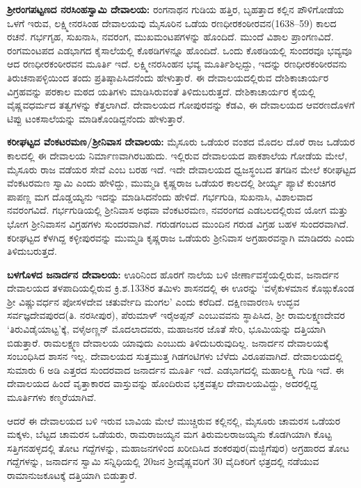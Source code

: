 \textbf{ ಶ‍್ರೀರಂಗಪಟ್ಟಣದ ನರಸಿಂಹಸ್ವಾಮಿ ದೇವಾಲಯ: } ರಂಗನಾಥನ ಗುಡಿಯ ಹತ್ತಿರ, ಬೃಹತ್ತಾದ ಕಲ್ಲಿನ ಪೌಳಿಗೋಡೆಯ ಒಳಗೆ ಇರುವ, ಲಕ್ಷ್ಮೀನರಸಿಂಹ ದೇವಾಲಯವು ಮೈಸೂರಿನ ಒಡೆಯ ರಣಧೀರಕಂಠೀರವನ(1638–59) ಕಾಲದ ರಚನೆ. ಗರ್ಭಗೃಹ, ಸುಖನಾಸಿ, ನವರಂಗ, ಮುಖಮಂಟಪಗಳನ್ನು ಹೊಂದಿದೆ. ಮುಂದೆ ವಿಶಾಲ ಪ್ರಾಂಗಣವಿದೆ. ರಂಗಮಂಟಪದ ಎಡಭಾಗದ ಕೈಸಾಲೆಯಲ್ಲಿ ಕೊಠಡಿಗಳನ್ನೂ ಹೊಂದಿದೆ. ಒಂದು ಕೊಠಡಿಯಲ್ಲಿ ಸುಂದರವೂ ಭವ್ಯವೂ ಆದ ರಣಧೀರಕಂಠೀರವನ ಮೂರ್ತಿ ಇದೆ. ಲಕ್ಷ್ಮೀನರಸಿಂಹನ ಭವ್ಯ ಮೂರ್ತಿಶಿಲ್ಪದ್ದು, ಇದನ್ನು ರಣಧೀರಕಂಠೀರವನು ತಿರುಚನಾಪಳ್ಳಿಯಿಂದ ತಂದು ಪ್ರತಿಷ್ಠಾಪಿಸಿದನೆಂದು ಹೇಳುತ್ತಾರೆ. ಈ ದೇವಾಲಯದಲ್ಲಿರುವ ದೇಶಿಕಾಚಾರ್ಯರ ವಿಗ್ರಹವನ್ನು ಪರಕಾಲ ಮಠದ ಯತಿಗಳು ಮಾಡಿಸಿರುವಂತೆ ತಿಳಿದುಬರುತ್ತದೆ. ದೇಶಿಕಾಚಾರ್ಯರ ಕೈಯಲ್ಲಿ ವೈಷ್ಣವಧರ್ಮದ ತತ್ವಗಳನ್ನು ಕೆತ್ತಲಾಗಿದೆ. ದೇವಾಲಯದ ಗೋಪುರವನ್ನು ಕೆಡವಿ, ಈ ದೇವಾಲಯದ ಆವರಣದೊಳಗೆ ಟಿಪ್ಪು ಟಂಕಸಾಲೆಯನ್ನು ಮಾಡಿಕೊಂಡಿದ್ದನೆಂದು ಹೇಳುತ್ತಾರೆ.

\textbf{ಕರೀಘಟ್ಟದ ವೆಂಕಟರಮಣ/ಶ‍್ರೀನಿವಾಸ ದೇವಾಲಯ:} ಮೈಸೂರು ಒಡೆಯರ ವಂಶದ ಮೊದಲ ದೊರೆ ರಾಜ ಒಡೆಯರ ಕಾಲದಲ್ಲಿ ಈ ದೇವಾಲಯ ನಿರ್ಮಾಣವಾಗಿರಬಹುದು. ಇಲ್ಲಿರುವ ದೇವಾಲಯದ ಪಾಕಶಾಲೆಯ ಗೋಡೆಯ ಮೇಲೆ, ಮೈಸೂರು ರಾಜ ವಡೆಯರ ಸೇವೆ ಎಂಬ ಬರಹ ಇದೆ. ಇದೇ ದೇವಾಲಯದ ಧ್ವಜಸ್ಥಂಬದ ತಗಡಿನ ಮೇಲೆ ಕರೀಘಟ್ಟದ ವೆಂಕಟರಮಣ ಸ್ವಾಮಿ ಎಂದು ಹೇಳಿದ್ದು, ಮುಮ್ಮಡಿ ಕೃಷ್ಣರಾಜ ಒಡೆಯರ ಕಾಲದಲ್ಲಿ ಶೀರ್ಯ್ಯ ಪ್ಯಾಟೆ ಕುಂಚಿಗರ ಪಾಪಣ್ಣ ಮಗ ದೊಡ್ಡಯ್ಯನು ಇದನ್ನು ಮಾಡಿಸಿದನೆಂದು ಹೇಳಿದೆ. ಗರ್ಭಗುಡಿ, ಸುಖನಾಸಿ, ವಿಶಾಲವಾದ ನವರಂಗವಿದೆ. ಗರ್ಭಗುಡಿಯಲ್ಲಿ ಶ‍್ರೀನಿವಾಸ ಅಥವಾ ವೆಂಕಟರಮಣ, ನವರಂಗದ ಎಡಬಲದಲ್ಲಿರುವ ಯೋಗ ಮತ್ತು ಭೋಗ ಶ‍್ರೀನಿವಾಸನ ವಿಗ್ರಹಗಳು ಸುಂದರವಾಗಿವೆ. ಗರುಡಗಂಬದ ಮುಂದಿನ ಗರುಡ ವಿಗ್ರಹ ಬಹಳ ಸುಂದರವಾಗಿದೆ. ಕರೀಘಟ್ಟದ ಕೆಳಗಿದ್ದ ಕಳ್ಳೀಪುರವನ್ನು ಮುಮ್ಮಡಿ ಕೃಷ್ಣರಾಜ ಒಡೆಯರು ಶ‍್ರೀನಿವಾಸ ಅಗ್ರಹಾರವನ್ನಾಗಿ ಮಾಡಿದರು ಎಂದು ತಿಳಿದುಬರುತ್ತದೆ. 

\textbf{ಬಳಗೊಳದ ಜನಾರ್ದನ ದೇವಾಲಯ:} ಊರಿನಿಂದ ಹೊರಗೆ ನಾಲೆಯ ಬಳಿ ಜೀರ್ಣಾವಸ್ಥೆಯಲ್ಲಿರುವ, ಜನಾರ್ದನ ದೇವಾಲಯದ ತಳಪಾದಿಯಲ್ಲಿರುವ ಕ್ರಿ.ಶ.1338ರ ತಮಿಳು ಶಾಸನದಲ್ಲಿ ಈ ಊರನ್ನು ‘ವಳೈಕುಳಮಾನ ಕೊಙ್ಗುಕೊಂಡ ಶ‍್ರೀ ವಿಷ್ಣುವರ್ಧನ ಪೋಸಳದೇವ ಚತುರ್ವೇದಿ ಮಂಗಲ’ ಎಂದು ಕರೆದಿದೆ. ದಕ್ಷಿಣವಾರಣಸಿ ಉದ್ಭವ ಸರ್ವಜ್ಞದೇವಪುರದ(ತಿ. ನರಸೀಪುರ), ಪೆರುಮಾಳ್​ ಇರೈಅಪ್ಪನ್​ ಎಂಬುವವನು ಸ್ಥಾಪಿಸಿದ, ಶ‍್ರೀ ರಾಮಲಕ್ಷ್ಮಣದೇವರ ‘ತಿರುವಿಡೈಯಾಟ್ಟ’ಕ್ಕೆ, ವಳೈಅಣ್ಣನ್​ ಮೊದಲಾದವರು, ಮಹಾಜನರ ಜೊತೆ ಸೇರಿ, ಭೂಮಿಯನ್ನು ದತ್ತಿಯಾಗಿ ಬಿಡುತ್ತಾರೆ. ರಾಮಲಕ್ಷ್ಮಣ ದೇವಾಲಯ ಯಾವುದು ಎಂಬುದು ತಿಳಿದುಬರುವುದಿಲ್ಲ. ಜನಾರ್ದನ ದೇವಾಲಯಕ್ಕೆ ಸಂಬಂಧಿಸಿದ ಶಾಸನ ಇಲ್ಲ. ದೇವಾಲಯದ ಸುತ್ತಮುತ್ತ ಗಿಡಗಂಟಿಗಳು ಬೆಳೆದು ವಿರೂಪವಾಗಿದೆ. ದೇವಾಲಯದಲ್ಲಿ ಸುಮಾರು 6 ಅಡಿ ಎತ್ತರದ ಸುಂದರವಾದ ಜನಾರ್ದನ ಮೂರ್ತಿ ಇದೆ. ಎಡಭಾಗದಲ್ಲಿ ಮಹಾಲಕ್ಷ್ಮಿ ಗುಡಿ ಇದೆ. ಈ ದೇವಾಲಯದ ಹಿಂದೆ ವೃತ್ತಾಕಾರದ ವಾಸ್ತುವನ್ನು ಹೊಂದಿರುವ ಭಕ್ತವತ್ಸಲ ದೇವಾಲಯವಿದ್ದು, ಅದರಲ್ಲಿದ್ದ ಮೂರ್ತಿಗಳು ಕಣ್ಮರೆಯಾಗಿವೆ. 

ಆದರೆ ಈ ದೇವಾಲಯದ ಬಳಿ ಇರುವ ಬಾವಿಯ ಮೇಲೆ ಮುಚ್ಚಿರುವ ಕಲ್ಲಿನಲ್ಲಿ, ಮೈಸೂರು ಚಾಮರಸ ಒಡೆಯರ ಮಕ್ಕಳು, ಬೆಟ್ಟದ ಚಾಮರಸ ಒಡೆಯರು, ರಾಮರಾಜಯ್ಯನ ಮಗ ತಿರುಮಲರಾಜಯ್ಯನು ಕೊಡಗಿಯಾಗಿ ಕೊಟ್ಟ ಸತ್ತಿಗನಹಳ್ಳದಲ್ಲಿ ತೋಟ ಗದ್ದೆಗಳನ್ನು, ಮಹಾಜನಗಳಿಂದ ಖರೀದಿಸಿದ ಶಂಕರಪುರ(ಮಜ್ಜಿಗೆಪುರ) ಅಗ್ರಹಾರದ ತೋಟ ಗದ್ದೆಗಳನ್ನು, ಜನಾರ್ದನ ಸ್ವಾಮಿ ಸನ್ನಿಧಿಯಲ್ಲಿ 20ಜನ ಶ‍್ರೀವೈಷ್ಣವರಿಗೆ 30 ವೈದಿಕರಿಗೆ ಛತ್ರದಲ್ಲಿ ನಡೆಯುವ ರಾಮಾನುಜಕೂಟಕ್ಕೆ ದತ್ತಿಯಾಗಿ ಬಿಡುತ್ತಾರೆ.

